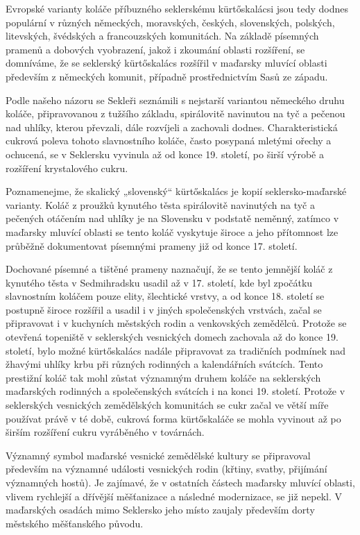 Evropské varianty koláče příbuzného seklerskému kürtőskalácsi jsou tedy
dodnes populární v různých německých, moravských, českých, slovenských,
polských, litevských, švédských a francouzských komunitách. Na základě
písemných pramenů a dobových vyobrazení, jakož i zkoumání oblasti
rozšíření, se domníváme, že se seklerský kürtőskalács rozšířil v
maďarsky mluvící oblasti především z německých komunit, případně
prostřednictvím Sasů ze západu.

Podle našeho názoru se Sekleři seznámili s nejstarší variantou německého
druhu koláče, připravovanou z tužšího základu, spirálovitě navinutou na
tyč a pečenou nad uhlíky, kterou převzali, dále rozvíjeli a zachovali
dodnes. Charakteristická cukrová poleva tohoto slavnostního koláče,
často posypaná mletými ořechy a ochucená, se v Seklersku vyvinula až od
konce 19. století, po širší výrobě a rozšíření krystalového cukru.

Poznamenejme, že skalický „slovenský`` kürtőskalács je kopií
seklersko-maďarské varianty. Koláč z proužků kynutého těsta spirálovitě
navinutých na tyč a pečených otáčením nad uhlíky je na Slovensku v
podstatě neměnný, zatímco v maďarsky mluvící oblasti se tento koláč
vyskytuje široce a jeho přítomnost lze průběžně dokumentovat písemnými
prameny již od konce 17. století.

Dochované písemné a tištěné prameny naznačují, že se tento jemnější
koláč z kynutého těsta v Sedmihradsku usadil až v 17. století, kde byl
zpočátku slavnostním koláčem pouze elity, šlechtické vrstvy, a od konce
18. století se postupně široce rozšířil a usadil i v jiných
společenských vrstvách, začal se připravovat i v kuchyních městských
rodin a venkovských zemědělců. Protože se otevřená topeniště v
seklerských vesnických domech zachovala až do konce 19. století, bylo
možné kürtőskalács nadále připravovat za tradičních podmínek nad žhavými
uhlíky krbu při různých rodinných a kalendářních svátcích. Tento
prestižní koláč tak mohl zůstat významným druhem koláče na seklerských
maďarských rodinných a společenských svátcích i na konci 19. století.
Protože v seklerských vesnických zemědělských komunitách se cukr začal
ve větší míře používat právě v té době, cukrová forma kürtőskaláče se
mohla vyvinout až po širším rozšíření cukru vyráběného v továrnách.

Významný symbol maďarské vesnické zemědělské kultury se připravoval
především na významné události vesnických rodin (křtiny, svatby,
přijímání významných hostů). Je zajímavé, že v ostatních částech
maďarsky mluvící oblasti, vlivem rychlejší a dřívější měšťanizace a
následné modernizace, se již nepekl. V maďarských osadách mimo Seklersko
jeho místo zaujaly především dorty městského měšťanského původu.

